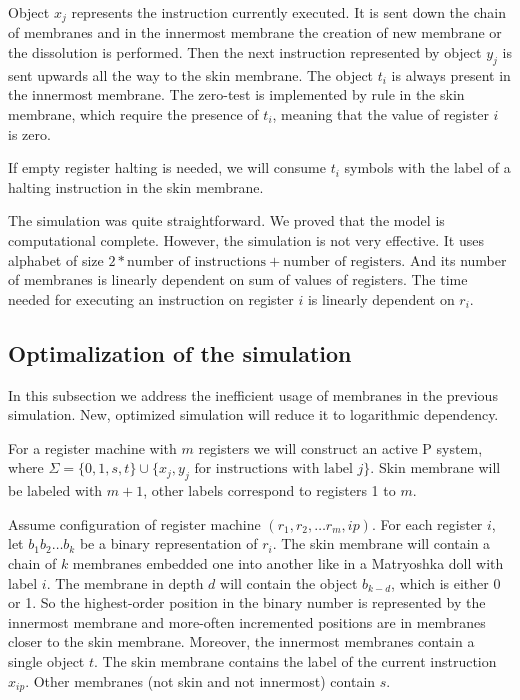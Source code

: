 \documentclass[llncs,submission,copyright,creativecommons]{../lib/lncs/llncs}
\begin{document}
Object $x_j$ represents the instruction currently executed. It is sent down the chain of membranes and in the innermost membrane the creation of new membrane or the dissolution is performed. Then the next instruction represented by object $y_j$ is sent upwards all the way to the skin membrane. The object $t_i$ is always present in the innermost membrane. The zero-test is implemented by rule in the skin membrane, which require the presence of $t_i$, meaning that the value of register $i$ is zero.  

If empty register halting is needed, we will consume $t_i$ symbols with the label of a halting instruction in the skin membrane.

The simulation was quite straightforward. We proved that the model is computational complete. However, the simulation is not very effective. It uses alphabet of size $2 * \text{number of instructions} + \text{number of registers}$. And its number of membranes is linearly dependent on sum of values of registers. The time needed for executing an instruction on register $i$ is linearly dependent on $r_i$.


\subsection{Optimalization of the simulation} %
\label{sub:optimalization_of_the_simulation}

In this subsection we address the inefficient usage of membranes in the previous simulation. New, optimized simulation will reduce it to logarithmic dependency.

For a register machine with $m$ registers we will construct an active P system, where $\Sigma = \{0,1,s,t\}\cup\{x_j, y_j \text{~for instructions with label~} j\}$. Skin membrane will be labeled with $m+1$, other labels correspond to registers 1 to $m$.

Assume configuration of register machine $(r_1, r_2, \ldots r_m, ip)$. For each register $i$, let $b_1b_2\ldots b_k$ be a binary representation of $r_i$. The skin membrane will contain a chain of $k$ membranes embedded one into another like in a Matryoshka doll with label $i$.
The membrane in depth $d$ will contain the object $b_{k-d}$, which is either 0 or 1. So the highest-order position in the binary number is represented by the innermost membrane and more-often incremented positions are in membranes closer to the skin membrane. Moreover, the innermost membranes contain a single object $t$. The skin membrane contains the label of the current instruction $x_{ip}$. Other membranes (not skin and not innermost) contain $s$.
\end{document}
